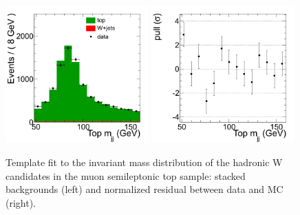 \begin{figure}[htb] 
  {\centering
    \includegraphics[width=0.49\textwidth]{figs/topwjes/Dibosonlnujj_TopControlSample_muon_Stacked_NoConv.png}
    \includegraphics[width=0.49\textwidth]{figs/topwjes/Dibosonlnujj_TopControlSample_muon_Pull_NoConv.png}
    \caption{Template fit to the invariant mass distribution of the hadronic 
      W candidates in the muon semileptonic top sample: stacked backgrounds (left) and normalized residual between data and MC (right).}
    \label{fig:topw:mu_MC}}
\end{figure}
